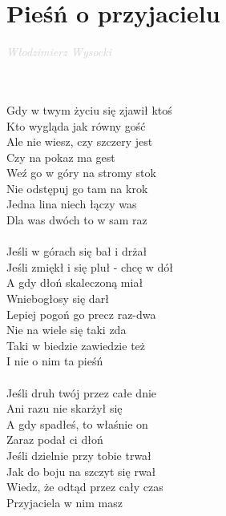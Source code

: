 \documentclass[a5paper, 10pt]{book}
\begin{document}
\section{Pieśń o przyjacielu}\textcolor{lightgray}{\textit{Włodzimierz Wysocki}}\\~\\
\begin{minipage}[t]{0.5\textwidth}
  ~\\
  Gdy w twym życiu się zjawił ktoś\\
  Kto wygląda jak równy gość\\
  Ale nie wiesz, czy szczery jest\\
  Czy na pokaz ma gest\\
  \hspace*{5mm}Weź go w góry na stromy stok\\
  \hspace*{5mm}Nie odstępuj go tam na krok\\
  \hspace*{5mm}Jedna lina niech łączy was\\
  \hspace*{5mm}Dla was dwóch to w sam raz\\
  \\
  Jeśli w górach się bał i drżał\\
  Jeśli zmiękł i się pluł - chcę w dół\\
  A gdy dłoń skaleczoną miał\\
  Wniebogłosy się darł\\
  \hspace*{5mm}Lepiej pogoń go precz raz-dwa\\
  \hspace*{5mm}Nie na wiele się taki zda\\
  \hspace*{5mm}Taki w biedzie zawiedzie też\\
  \hspace*{5mm}I nie o nim ta pieśń\\
  \\
  Jeśli druh twój przez całe dnie\\
  Ani razu nie skarżył się\\
  A gdy spadłeś, to właśnie on\\
  Zaraz podał ci dłoń\\
  \hspace*{5mm}Jeśli dzielnie przy tobie trwał\\
  \hspace*{5mm}Jak do boju na szczyt się rwał\\
  \hspace*{5mm}Wiedz, że odtąd przez cały czas\\
  \hspace*{5mm}Przyjaciela w nim masz\\
\end{minipage}
\end{document}
